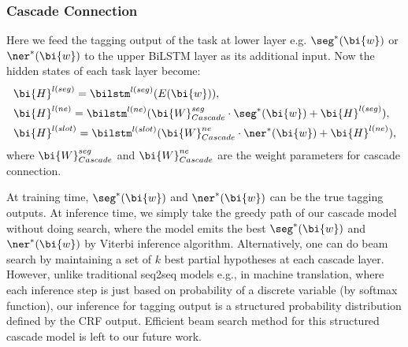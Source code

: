 \subsubsection{Cascade Connection}
Here we feed the tagging output of the task at lower layer 
e.g. $\seg^*(\bi{w})$ or $\ner^*(\bi{w})$
to the upper BiLSTM layer as its additional input.
Now the hidden states of each task layer become:
\begin{eqnarray*}
	& \bi{H}^{l(seg)}=\bilstm^{l(seg)}(E(\bi{w})), \\
	& \bi{H}^{l(ne)}= \bilstm^{l(ne)}(\bi{W}_{Cascade}^{seg}\cdot \seg^*(\bi{w})+\bi{H}^{l(seg)}), \\
	& \bi{H}^{l(slot)}= \bilstm^{l(slot)}(\bi{W}_{Cascade}^{ne}\cdot \ner^*(\bi{w})+\bi{H}^{l(ne)}),
\end{eqnarray*}
where $\bi{W}_{Cascade}^{seg}$ and $\bi{W}_{Cascade}^{ne}$ are the weight parameters for cascade connection.

At training time, $\seg^*(\bi{w})$ and $\ner^*(\bi{w})$ can be the 
true tagging outputs.
At inference time, we simply take the greedy path of our cascade model 
without doing search, where the model emits the
best $\seg^*(\bi{w})$ and $\ner^*(\bi{w})$ by Viterbi inference algorithm.
Alternatively, one can do beam search \cite{sutskever2014sequence,vinyals2015show} by maintaining a set of $k$ best partial hypotheses at each cascade layer.
However, unlike traditional seq2seq models e.g., in machine translation,
where each inference step is just based on probability of a discrete variable 
(by softmax function), our inference for tagging output is a 
structured probability distribution defined by the CRF output.
Efficient beam search method for this structured cascade model is 
left to our future work.

